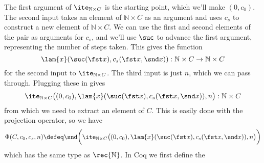 The first argument of $\ite_{\mathbb{N} \times C}$ is the starting point,
which we'll make $(0, c_{0})$.  The second input takes an element of
$\mathbb{N} \times C$ as an argument and uses $c_{s}$ to construct a new
element of $\mathbb{N} \times C$.  We can use the first and second elements of
the pair as arguments for $c_{s}$, and we'll use $\suc$ to advance the first
argument, representing the number of steps taken.  This gives the function
\[
\lam{x}(\suc(\fst x), c_{s}(\fst x, \snd x)) 
: \mathbb{N} \times C \to \mathbb{N} \times C
\]
for the second input to $\ite_{\mathbb{N} \times C}$.  The third input is just
$n$, which we can pass through.  Plugging these in gives
\[
\ite_{\mathbb{N} \times C}\big(
(0, c_{0}),
\lam{x}(\suc(\fst x), c_{s}(\fst x, \snd x)),
n
\big)
: \mathbb{N} \times C
\]
from which we need to extract an element of $C$.  This is easily done with the
projection operator, so we have
\[
\Phi(C, c_{0}, c_{s}, n) \defeq
\snd\bigg(
\ite_{\mathbb{N} \times C}\big(
(0, c_{0}),
\lam{x}(\suc(\fst x), c_{s}(\fst x, \snd x)),
n
\big)
\bigg)
\]
which has the same type as $\rec{\mathbb{N}}$.  In Coq we first define the
